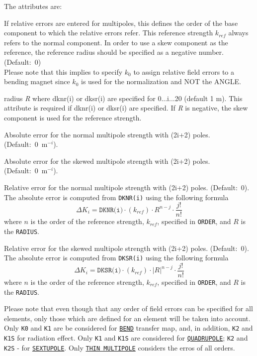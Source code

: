 The attributes are: 
\begin{madlist}
   If relative errors are entered for multipoles, this defines
  the order of the base component to which the relative  errors
  refer. This reference strength $k_{ref}$ always refers to the
  normal component. In order to use a skew component as the reference, the
  reference radius should be specified as a negative number. (Default:~0)  \\
  Please note that this implies to specify $k_0$ to assign
  relative field errors to a bending magnet since $k_0$ is used
  for the normalization and NOT the ANGLE. 

   radius \textit{R} where dknr(i) or dksr(i) are specified
  for 0...i...20 (default 1 m). This attribute is required if dknr(i) or
  dksr(i) are specified. If \textit{R} is negative, the skew component is
  used for the reference strength.  

   Absolute error for the normal multipole strength with
  (2i+2) poles. (Default:~0~m$^{-i}$).  

   Absolute error for the skewed multipole strength with
  (2i+2) poles. (Default:~0~m$^{-i}$).  

   Relative error for the normal multipole strength with
  (2i+2) poles. (Default:~0). The absolute error is computed from \texttt{DKNR(i)} using the following formula
  $$\Delta K_{i}=\texttt{DKNR(i)}\cdot\left(k_{ref}\right)\cdot R^{n-j}\cdot\frac{j!}{n!}$$
  where $n$ is the order of the reference strength, $k_{ref}$, specified in \texttt{ORDER}, and $R$ is the \texttt{RADIUS}.

   Relative error for the skewed multipole strength with
  (2i+2) poles. (Default:~0). The absolute error is computed from \texttt{DKSR(i)} using the following formula
  $$\Delta K_{i}=\texttt{DKSR(i)}\cdot\left(k_{ref}\right)\cdot |R|^{n-j}\cdot\frac{j!}{n!}$$
  where $n$ is the order of the reference strength, $k_{ref}$, specified in \texttt{ORDER}, and $R$ is the \texttt{RADIUS}. 
\end{madlist}

 Please note that even though that any order of field errors can be specified 
 for all elements, only those which are defined for an element will be taken into account.
 Only \texttt{K0} and  \texttt{K1} are be considered for  \hyperref[sec:bend]{\texttt{BEND}} 
 transfer map, and, in addition, \texttt{K2} and \texttt{K1S} for radiation effect. Only 
 \texttt{K1} and \texttt{K1S} are considered for  \hyperref[sec:quadrupole]{\texttt{QUADRUPOLE}}; 
 \texttt{K2}  and \texttt{K2S} - for \hyperref[sec:sextupole]{\texttt{SEXTUPOLE}}. Only 
 \hyperref[sec:multipole]{\texttt{THIN MULTIPOLE}} considers the erros of all orders. 
 

